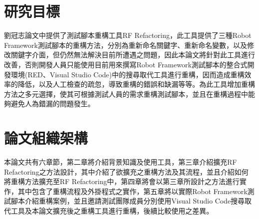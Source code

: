 
\section{研究目標}
\indent
劉冠志論文\cite{LIU-Thesis}中提供了測試腳本重構工具RF Refactoring，此工具提供了三種Robot Framework測試腳本的重構方法，分別為重新命名關鍵字、重新命名變數，以及修改關鍵字介面，但仍然無法解決目前所遭遇之問題，因此本論文將針對此工具進行改善，否則開發人員只能使用目前用來撰寫Robot Framework測試腳本的整合式開發環境(RED\cite{RED}、Visual Studio Code\cite{VSCode})中的搜尋取代工具進行重構，因而造成重構效率的降低，以及人工檢查的疏忽，導致重構的錯誤和缺漏等等。為此工具增加重構方法之多元選擇，使其可根據測試人員的需求重構測試腳本，並且在重構過程中能夠避免人為錯漏的問題發生。

\section{論文組織架構}
\indent
本論文共有六章節，第二章將介紹背景知識及使用工具，第三章介紹擴充RF Refactoring之方法設計，其中介紹了欲擴充之重構方法及其流程，並且介紹如何將重構方法擴充至RF Refactoring中，第四章將會以第三章所設計之方法進行實作，其中包含了重構流程及外掛程式之實作，第五章將以實際Robot Framework測試腳本介紹重構案例，並且邀請測試團隊成員分別使用Visual Studio Code搜尋取代工具及本論文擴充後之重構工具進行重構，後續比較使用之差異。